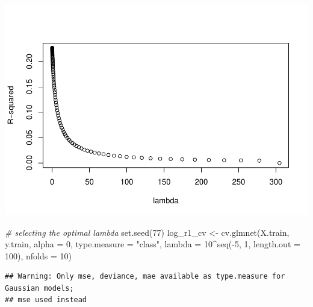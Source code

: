 \documentclass[
]{article}
\newenvironment{Shaded}{\begin{snugshade}}{\end{snugshade}}
\newcommand{\AttributeTok}[1]{\textcolor[rgb]{0.77,0.63,0.00}{#1}}
\newcommand{\CommentTok}[1]{\textcolor[rgb]{0.56,0.35,0.01}{\textit{#1}}}
\newcommand{\DecValTok}[1]{\textcolor[rgb]{0.00,0.00,0.81}{#1}}
\newcommand{\FunctionTok}[1]{\textcolor[rgb]{0.00,0.00,0.00}{#1}}
\newcommand{\NormalTok}[1]{#1}
\newcommand{\OtherTok}[1]{\textcolor[rgb]{0.56,0.35,0.01}{#1}}
\newcommand{\SpecialCharTok}[1]{\textcolor[rgb]{0.00,0.00,0.00}{#1}}
\newcommand{\StringTok}[1]{\textcolor[rgb]{0.31,0.60,0.02}{#1}}
\begin{document}
\includegraphics{1992-US-election_files/figure-latex/unnamed-chunk-12-2.pdf}

\begin{Shaded}
\begin{Highlighting}[]
\CommentTok{\# selecting the optimal lambda}
\FunctionTok{set.seed}\NormalTok{(}\DecValTok{77}\NormalTok{)}
\NormalTok{log\_r1\_cv }\OtherTok{\textless{}{-}} \FunctionTok{cv.glmnet}\NormalTok{(X.train, y.train, }\AttributeTok{alpha =} \DecValTok{0}\NormalTok{, }\AttributeTok{type.measure =} \StringTok{"class"}\NormalTok{, }
                       \AttributeTok{lambda =} \DecValTok{10}\SpecialCharTok{\^{}}\FunctionTok{seq}\NormalTok{(}\SpecialCharTok{{-}}\DecValTok{5}\NormalTok{, }\DecValTok{1}\NormalTok{, }\AttributeTok{length.out =} \DecValTok{100}\NormalTok{), }
                        \AttributeTok{nfolds =} \DecValTok{10}\NormalTok{)}
\end{Highlighting}
\end{Shaded}

\begin{verbatim}
## Warning: Only mse, deviance, mae available as type.measure for Gaussian models;
## mse used instead
\end{verbatim}

\begin{Shaded}
\end{Shaded}
\end{document}
